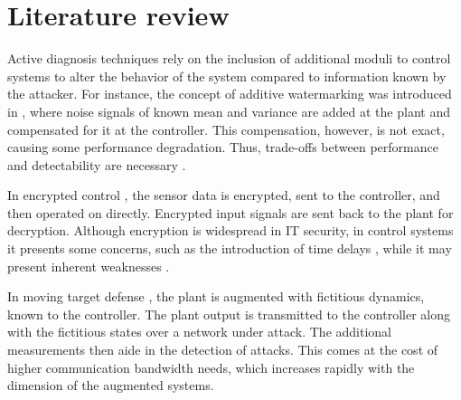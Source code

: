\section{Literature review}
Active diagnosis techniques rely on the inclusion of additional moduli to control systems
to alter the behavior of the system compared to information known by the attacker. 
For instance, the concept of additive watermarking was introduced in \cite{mo2015physical}, where noise signals of known mean and variance are added at the plant and compensated for it at the controller. 
This compensation, however, is not exact, causing some performance degradation. Thus, trade-offs between performance and detectability  are necessary \citep{zhu2023detection}.

In encrypted control \citep{darup2021encrypted}, the sensor data is encrypted, sent to the controller, and then operated on directly. Encrypted input signals are sent back to the plant for decryption. Although encryption is widespread in IT security, in control systems it presents some concerns, such as the introduction of time delays \citep{stabile2024verifiable}, while it may present inherent weaknesses \citep{alisic2023model}.

In moving target defense \citep{griffioen2020moving}, the plant is augmented with fictitious dynamics, known to the controller. The plant output is transmitted to the controller along with the fictitious states over a network under attack. 
The additional measurements then aide in the detection of attacks. 
This comes at the cost of higher communication bandwidth needs, which increases rapidly with the dimension of the augmented systems.

